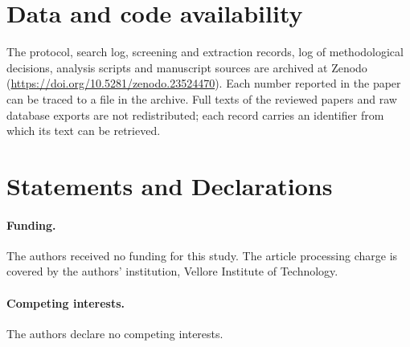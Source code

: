 \documentclass[acmsmall,screen]{acmart}
\begin{document}
\maketitle













\section*{Data and code availability}
The protocol, search log, screening and extraction records, log of methodological decisions, analysis scripts and manuscript sources are archived at Zenodo~\cite{goenka2026dlmdata} (\url{https://doi.org/10.5281/zenodo.23524470}). Each number reported in the paper can be traced to a file in the archive. Full texts of the reviewed papers and raw database exports are not redistributed; each record carries an identifier from which its text can be retrieved. %

\section*{Statements and Declarations}
\paragraph{Funding.} The authors received no funding for this study. The article processing charge is covered by the authors' institution, Vellore Institute of Technology.
\paragraph{Competing interests.} The authors declare no competing interests.
\end{document}
